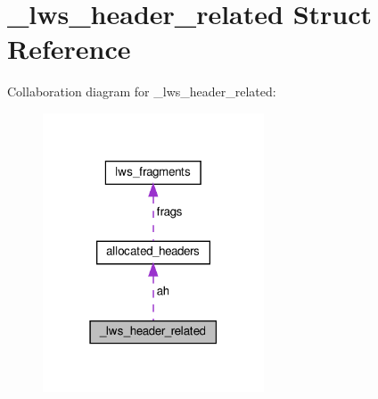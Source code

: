 \hypertarget{struct__lws__header__related}{}\section{\+\_\+lws\+\_\+header\+\_\+related Struct Reference}
\label{struct__lws__header__related}


Collaboration diagram for \+\_\+lws\+\_\+header\+\_\+related\+:
\nopagebreak
\begin{figure}[H]
\begin{center}
\leavevmode
\includegraphics[width=186pt]{struct__lws__header__related__coll__graph}
\end{center}
\end{figure}
